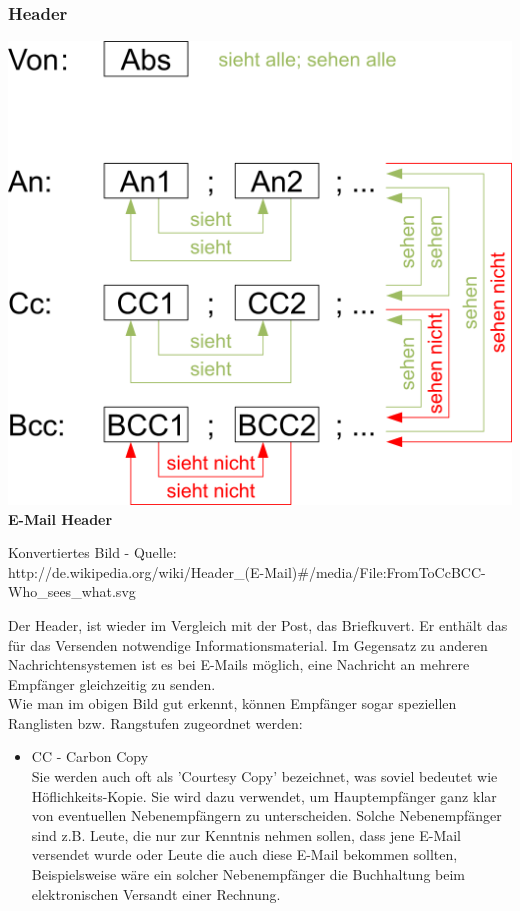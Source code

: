 \documentclass[12pt,a4paper]{report}
\begin{document}
\begin{onehalfspace}
\subsubsection{Header}
\begin{center}
\includegraphics[scale=0.9]{../docs/lyaton/graphics/E-Mail-Header.png}\\
\textbf{E-Mail Header}\\
\begin{tiny}
Konvertiertes Bild - Quelle:\\http://de.wikipedia.org/wiki/Header\_(E-Mail)\#/media/File:FromToCcBCC-Who\_sees\_what.svg
\end{tiny}
\end{center}
\vspace{0.5cm}
Der Header, ist wieder im Vergleich mit der Post, das Briefkuvert. Er enthält das für das Versenden notwendige Informationsmaterial. Im Gegensatz zu anderen Nachrichtensystemen ist es bei E-Mails möglich, eine Nachricht an mehrere Empfänger gleichzeitig zu senden.\\
Wie man im obigen Bild gut erkennt, können Empfänger sogar speziellen Ranglisten bzw. Rangstufen zugeordnet werden:
\begin{itemize}
\item CC - Carbon Copy\\
Sie werden auch oft als 'Courtesy Copy' bezeichnet, was soviel bedeutet wie Höflichkeits-Kopie. Sie wird dazu verwendet, um Hauptempfänger ganz klar von eventuellen Nebenempfängern zu unterscheiden. Solche Nebenempfänger sind z.B. Leute, die nur zur Kenntnis nehmen sollen, dass jene E-Mail versendet wurde oder Leute die auch diese E-Mail bekommen sollten, Beispielsweise wäre ein solcher Nebenempfänger die Buchhaltung beim elektronischen Versandt einer Rechnung.

\end{itemize}
\end{onehalfspace}
\end{document}
